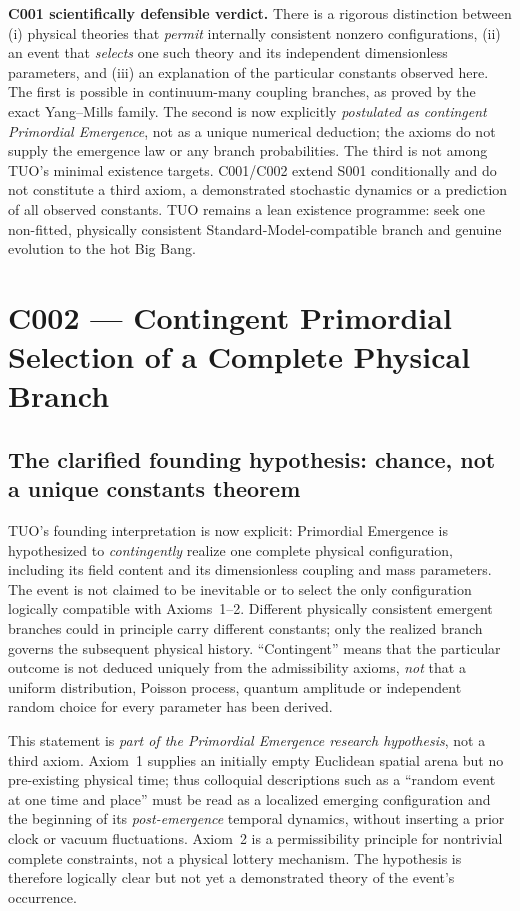 \documentclass[11pt,a4paper]{article}
\theoremstyle{tmon}
\theoremstyle{definition}
\begin{document}
\begin{warningbox}
\textbf{C001 scientifically defensible verdict.} There is a rigorous distinction between (i) physical theories that \emph{permit} internally consistent nonzero configurations, (ii) an event that \emph{selects} one such theory and its independent dimensionless parameters, and (iii) an explanation of the particular constants observed here. The first is possible in continuum-many coupling branches, as proved by the exact Yang--Mills family. The second is now explicitly \emph{postulated as contingent Primordial Emergence}, not as a unique numerical deduction; the axioms do not supply the emergence law or any branch probabilities. The third is not among TUO's minimal existence targets. C001/C002 extend S001 conditionally and do not constitute a third axiom, a demonstrated stochastic dynamics or a prediction of all observed constants. TUO remains a lean existence programme: seek one non-fitted, physically consistent Standard-Model-compatible branch and genuine evolution to the hot Big Bang.
\end{warningbox}


\clearpage
\section{C002 --- Contingent Primordial Selection of a Complete Physical Branch}\label{sec:c002}
\subsection{The clarified founding hypothesis: chance, not a unique constants theorem}
TUO's founding interpretation is now explicit: Primordial Emergence is hypothesized to \emph{contingently} realize one complete physical configuration, including its field content and its dimensionless coupling and mass parameters. The event is not claimed to be inevitable or to select the only configuration logically compatible with Axioms~1--2. Different physically consistent emergent branches could in principle carry different constants; only the realized branch governs the subsequent physical history. ``Contingent'' means that the particular outcome is not deduced uniquely from the admissibility axioms, \emph{not} that a uniform distribution, Poisson process, quantum amplitude or independent random choice for every parameter has been derived.

This statement is \emph{part of the Primordial Emergence research hypothesis}, not a third axiom. Axiom~1 supplies an initially empty Euclidean spatial arena but no pre-existing physical time; thus colloquial descriptions such as a ``random event at one time and place'' must be read as a localized emerging configuration and the beginning of its \emph{post-emergence} temporal dynamics, without inserting a prior clock or vacuum fluctuations. Axiom~2 is a permissibility principle for nontrivial complete constraints, not a physical lottery mechanism. The hypothesis is therefore logically clear but not yet a demonstrated theory of the event's occurrence.
\end{document}

